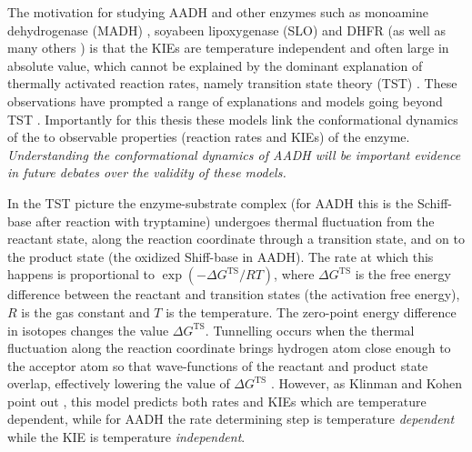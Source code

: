 The motivation for studying AADH and other enzymes such as monoamine dehydrogenase (MADH) \cite{brooksDeuteriumKineticIsotope1993, basranEnzymaticHTransferRequires1999},  soyabeen lipoxygenase (SLO) \cite{glickmanExtremelyLargeIsotope1994, knappTemperatureDependentIsotopeEffects2002} and  DHFR \cite{sikorskiTunnelingCoupledMotion2004, loveridgeSolventEffectsCatalysis2010a} (as well as many others \cite{puMultidimensionalTunnelingRecrossing2006}) is that the KIEs are temperature independent and often large in absolute value, which cannot be explained \cite{klinmanHydrogenTunnelingLinks2013} by the dominant explanation of thermally activated reaction rates, namely transition state theory (TST) \cite{garciavilocaHowEnzymesWork2004}. These observations have prompted a range of explanations and models going beyond TST \cite{masgrau2004hydrogen, brunoVibrationallyEnhancedTunneling1992, borgisCurveCrossingFormulation1996, antoniouLargeKineticIsotope1997, klinmanbeyond2009}.  Importantly for this thesis these models  link the conformational dynamics of the to observable properties (reaction rates and KIEs) of the enzyme. \emph{Understanding the conformational dynamics of AADH will be important evidence in future debates over the validity of these models.}  

In the TST picture the enzyme-substrate complex (for AADH this is the Schiff-base after reaction with tryptamine) undergoes thermal fluctuation from the reactant state,  along the reaction coordinate through a transition state, and on to the product state (the oxidized Shiff-base in AADH). The rate at which this happens is proportional to $\exp{(-\Delta G^{\mathrm{TS}}/RT)}$, where  $\Delta G^{\mathrm{TS}}$ is the free energy difference between the reactant and transition states (the activation free energy), $R$ is the gas constant and $T$ is the temperature. The zero-point energy difference in isotopes changes the value $\Delta G^{\mathrm{TS}}$. Tunnelling occurs when the thermal fluctuation along the reaction coordinate brings hydrogen atom close enough to the acceptor atom so that wave-functions of the reactant and product state overlap, effectively lowering the value of $\Delta G^{\mathrm{TS}}$ \cite{puMultidimensionalTunnelingRecrossing2006}.  However, as Klinman and Kohen point out \cite{klinmanHydrogenTunnelingLinks2013}, this model predicts both rates and KIEs which are temperature dependent, while for AADH the rate determining step is temperature \emph{dependent} while the KIE is temperature \emph{independent}. 

